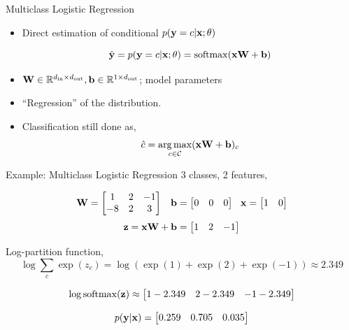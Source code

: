 \documentclass{beamer}
\begin{document}
\begin{frame}{Multiclass Logistic Regression}
  \begin{itemize}
  \item Direct estimation of conditional $p(\mathbf{y} =c | \mathbf{x}; \theta)$

    \[\hat{\boldy} =  p(\boldy =c | \boldx; \theta) =  \softmax(\boldx \boldW + \boldb) \]
  \item $\mathbf{W} \in \mathbb{R}^{{d_{\mathrm{in}}} \times {d_{\mathrm{out}}}}, \mathbf{b} \in \mathbb{R}^{1 \times {d_{\mathrm{out}}}}$; model parameters

  \item ``Regression'' of the distribution.
  \item Classification still done as,
    \[ \hat{c} =  \argmax_{c \in \mcC} (\boldx \boldW + \boldb)_c  \]

  \end{itemize}





\end{frame}

\begin{frame}{Example: Multiclass Logistic Regression}
  3 classes, 2 features,

  \begin{eqnarray*}
    \mathbf{W} = \begin{bmatrix} 1  & 2 & -1 \\ -8 & 2 & 3 \\ \end{bmatrix}  &&   \mathbf{b} = \begin{bmatrix} 0  & 0  & 0\\ \end{bmatrix} \ \  \mathbf{x} = \begin{bmatrix} 1  & 0 \\ \end{bmatrix} \\
  \end{eqnarray*}
  \[ \mathbf{z} = \mathbf{x} \mathbf{W} + \mathbf{b} = \begin{bmatrix} 1 & 2 & -1 \\ \end{bmatrix} \]

  Log-partition function,
  \[ \log \sum_c \exp(z_c) = \log ( \exp(1)  +  \exp(2) + \exp(-1) ) \approx 2.349 \]

  \[\log \softmax(\boldz) \approx \begin{bmatrix}  1 - 2.349   &  2- 2.349 & -1 - 2.349 \\ \end{bmatrix}  \]

  \[p(\mathbf{y}| \mathbf{x}) = \begin{bmatrix} 0.259 & 0.705 & 0.035 \end{bmatrix}   \]
\end{frame}
\end{document}
